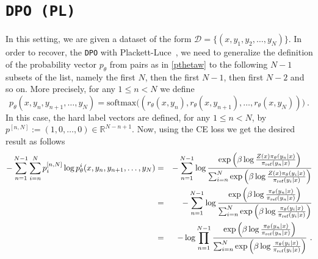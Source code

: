 \section{\texttt{DPO (PL)}} \label{Appendix:DPO_PL}
    In this setting, we are given a dataset of the form $\mathcal{D} = \{ (x,y_1, y_2,\ldots,y_N) \}$. In order to recover, the \texttt{DPO} with Plackett-Luce~\cite{DPO}, we need to generalize the definition of the probability vector $p_{\theta}$ from pairs as in \eqref{pthetaw} to the following $N - 1$ subsets of the list, namely the first $N$, then the first $N-1$, then first $N-2$ and so on. More precisely, for any $1 \leq n < N$ we define 
    \begin{equation*}
        p_{\theta}(x,y_n, y_{n + 1} , \ldots, y_N) = \textrm{softmax}\big(\left(r_{\theta}(x,y_n), r_{\theta}(x,y_{n+1}), \ldots, r_{\theta}(x,y_N)\right)\big)\ .
    \end{equation*}
    In this case, the hard label vectors are defined, for any $1 \leq n < N$, by $p^{[n,N]} := (1 , 0 , \ldots , 0) \in \mathbb{R}^{N - n + 1}$. Now, using the CE loss we get the desired result as follows
    \begin{eqnarray*}
        -\sum_{n = 1}^{N - 1}\sum_{i = n}^{N} p_{i}^{[n,N]}\log p_{\theta}^{i}(x,y_n, y_{n + 1} , \ldots, y_N) & = & - \sum_{n = 1}^{N - 1} \log \frac{\exp\left(\beta\log \frac{Z(x)\pi_{\theta}(y_{n}|x)}{\pi_{\textrm{ref}}(y_{n}|x)}\right)}{\sum_{i = n}^{N} \exp\left(\beta\log \frac{Z(x)\pi_{\theta}(y_{i}|x)}{\pi_{\textrm{ref}}(y_{i}|x)}\right)}\\
        & = & - \sum_{n = 1}^{N - 1} \log \frac{\exp\left(\beta\log \frac{\pi_{\theta}(y_{n}|x)}{\pi_{\textrm{ref}}(y_{n}|x)}\right)}{\sum_{i = n}^{N} \exp\left(\beta\log \frac{\pi_{\theta}(y_{i}|x)}{\pi_{\textrm{ref}}(y_{i}|x)}\right)}\\
        & = & - \log \prod_{n = 1}^{N - 1} \frac{\exp\left(\beta\log \frac{\pi_{\theta}(y_{n}|x)}{\pi_{\textrm{ref}}(y_n|x)}\right)}{\sum_{i = n}^{N} \exp\left(\beta\log \frac{\pi_{\theta}(y_{i}|x)}{\pi_{\textrm{ref}}(y_{i}|x)}\right)}\ .
    \end{eqnarray*}

